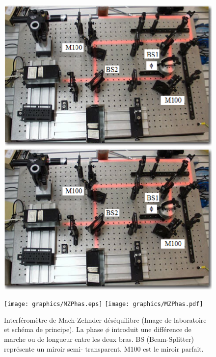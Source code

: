 \begin{figure}[ptbh]
\centering
\begin{minipage}[c]{.58\linewidth}
\ifcase\msipdfoutput
	\includegraphics{graphics/MZPhaseImage.eps}%
\else
	\includegraphics{graphics/MZPhaseImage.pdf}%
\fi
\end{minipage} \hfill
\begin{minipage}[c]{.30\linewidth}
\ifcase\msipdfoutput
	\texttt{[image: graphics/MZPhas.eps]}
\else
	\texttt{[image: graphics/MZPhas.pdf]}
\fi
\end{minipage}
\caption{Interféromètre de Mach-Zehnder déséquilibre (Image de laboratoire et
schéma de principe). La phase $\phi$ introduit une différence de marche ou de
longueur entre les deux bras. BS (Beam-Splitter) représente un miroir semi-
transparent. M100 est le miroir parfait.}%
\label{fig:MZPhase}%
\end{figure}

